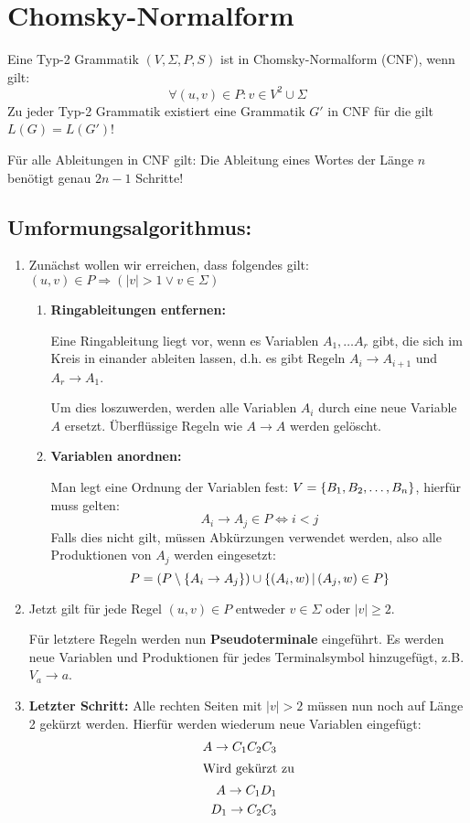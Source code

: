 \section{Chomsky-Normalform}
Eine Typ-2 Grammatik $(V,\Sigma,P,S)$ ist in Chomsky-Normalform (CNF),  wenn gilt:
\begin{equation*}
	\forall (u,v)\in P: v\in V^2\cup \Sigma
\end{equation*}
Zu jeder Typ-2 Grammatik existiert eine Grammatik $G'$ in CNF für die gilt $L(G)=L(G')$!

Für alle Ableitungen in CNF gilt: Die Ableitung eines Wortes der Länge $n$ benötigt genau $2n-1$ Schritte!
\subsection{Umformungsalgorithmus:}
\begin{enumerate}
	\item Zunächst wollen wir erreichen, dass folgendes gilt: $(u,v)\in P\Rightarrow (|v|>1 \vee v\in \Sigma)$
	\begin{enumerate}
		\item \textbf{Ringableitungen entfernen:}

		Eine Ringableitung liegt vor, wenn es Variablen $A_1,\ldots A_r$ gibt, die sich im Kreis in einander ableiten lassen, d.h. es gibt Regeln $A_i\rightarrow A_{i+1}$ und $A_r\rightarrow A_1$.

		Um dies loszuwerden, werden alle Variablen $A_i$ durch eine neue Variable $A$ ersetzt. Überflüssige Regeln wie $A\rightarrow A$ werden gelöscht.
		\item \textbf{Variablen anordnen:}

		Man legt eine Ordnung der Variablen fest: $V=\left\{ B_1, B_2, \ldots, B_n \right\}$, hierfür muss gelten:
		\begin{equation*}
			A_i\rightarrow A_j \in P \Leftrightarrow i<j
		\end{equation*}
		Falls dies nicht gilt, müssen Abkürzungen verwendet werden, also alle Produktionen von $A_j$ werden eingesetzt:
		\begin{equation*}
			P=(P\setminus\left\{ A_i\rightarrow A_j \right\})\cup\left\{ (A_i,w) \,\middle|\, (A_j,w)\in P \right\}
		\end{equation*}
	\end{enumerate}
	\item Jetzt gilt für jede Regel $(u,v)\in P$ entweder $v\in\Sigma$ oder $|v|\geq 2$.

	Für letztere Regeln werden nun \textbf{Pseudoterminale} eingeführt. Es werden neue Variablen und Produktionen für jedes Terminalsymbol hinzugefügt, z.B. $V_a\rightarrow a$.

	\item \textbf{Letzter Schritt:} Alle rechten Seiten mit $|v|>2$ müssen nun noch auf Länge 2 gekürzt werden. Hierfür werden wiederum neue Variablen eingefügt:%
	\begin{align*}
		A\rightarrow C_1C_2C_3\\
		\intertext{Wird gekürzt zu}
		A\rightarrow C_1D_1\\
		D_1\rightarrow C_2C_3
	\end{align*}
\end{enumerate}

